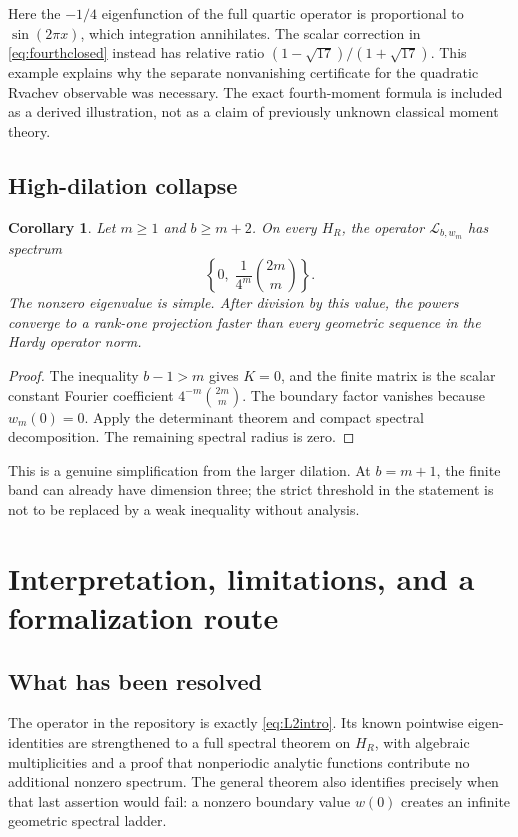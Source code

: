 \documentclass[11pt,a4paper]{article}
\newtheorem{corollary}[theorem]{Corollary}
\theoremstyle{definition}
\theoremstyle{remark}
\newcommand{\Lop}{\mathcal L}
\numberwithin{equation}{section}
\begin{document}
Here the $-1/4$ eigenfunction of the full quartic operator is proportional
to $\sin(2\pi x)$, which integration annihilates. The scalar correction in
\cref{eq:fourthclosed} instead has relative ratio
$(1-\sqrt{17})/(1+\sqrt{17})$. This example explains why the separate
nonvanishing certificate for the quadratic Rvachev observable was necessary.
The exact fourth-moment formula is included as a derived illustration,
not as a claim of previously unknown classical moment theory.

\subsection{High-dilation collapse}
\begin{corollary}
\label{cor:highdilation}
Let $m\ge1$ and $b\ge m+2$. On every $H_R$, the operator
$\Lop_{b,w_m}$ has spectrum
\begin{equation}
 \left\{0,\;\frac{1}{4^m}\binom{2m}{m}\right\}.
 \label{eq:highdilationspectrum}
\end{equation}
The nonzero eigenvalue is simple. After division by this value, the powers
converge to a rank-one projection faster than every geometric sequence in
the Hardy operator norm.
\end{corollary}
\begin{proof}
The inequality $b-1>m$ gives $K=0$, and the finite matrix is the scalar
constant Fourier coefficient $4^{-m}\binom{2m}{m}$. The boundary factor
vanishes because $w_m(0)=0$. Apply the determinant theorem and compact
spectral decomposition. The remaining spectral radius is zero.
\end{proof}

This is a genuine simplification from the larger dilation. At $b=m+1$,
the finite band can already have dimension three; the strict threshold in
the statement is not to be replaced by a weak inequality without analysis.

\section{Interpretation, limitations, and a formalization route}
\label{sec:status}

\subsection{What has been resolved}
The operator in the repository is exactly \cref{eq:L2intro}. Its known
pointwise eigen-identities are strengthened to a full spectral theorem on
$H_R$, with algebraic multiplicities and a proof that nonperiodic analytic
functions contribute no additional nonzero spectrum. The general theorem
also identifies precisely when that last assertion would fail: a nonzero
boundary value $w(0)$ creates an infinite geometric spectral ladder.
\end{document}
